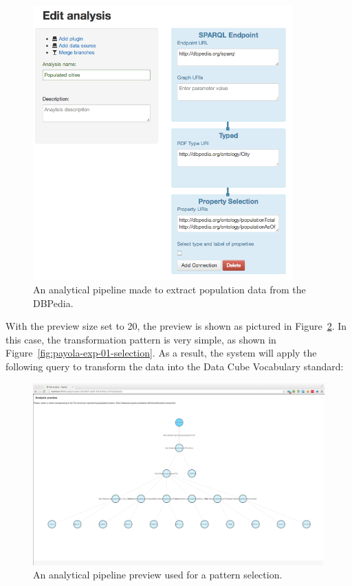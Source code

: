 \begin{figure}
  \centering
  \includegraphics[width=100mm]{img/payola-exp-01-step1.png}
  \caption{An analytical pipeline made to extract population data from the DBPedia.}
  \label{fig:dbpedia-pop-anal}
\end{figure}

With the preview size set to 20, the preview is shown as pictured in 
Figure~\ref{fig:payola-exp-01-preview}. In this case, the transformation pattern 
is very simple, as shown in Figure~\ref{fig:payola-exp-01-selection}. As a 
result, the system will apply the following query to transform the data into the
Data Cube Vocabulary standard:

\begin{figure}
  \centering
  \includegraphics[width=140mm]{img/payola-exp-01-preview.png}
  \caption{An analytical pipeline preview used for a pattern selection.}
  \label{fig:payola-exp-01-preview}
\end{figure}

